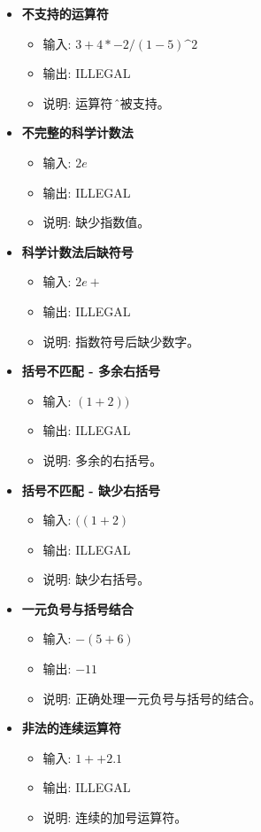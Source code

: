 \documentclass{article}
\begin{document}
\begin{itemize}
    \item \textbf{不支持的运算符}
    \begin{itemize}
        \item 输入: \(3 + 4 * -2 / (1 - 5)\^2\)
        \item 输出: ILLEGAL
        \item 说明: 运算符 \^ 不被支持。
    \end{itemize}
    \item \textbf{不完整的科学计数法}
    \begin{itemize}
        \item 输入: \(2e\)
        \item 输出: ILLEGAL
        \item 说明: 缺少指数值。
    \end{itemize}
    \item \textbf{科学计数法后缺符号}
    \begin{itemize}
        \item 输入: \(2e+\)
        \item 输出: ILLEGAL
        \item 说明: 指数符号后缺少数字。
    \end{itemize}
    \item \textbf{括号不匹配 - 多余右括号}
    \begin{itemize}
        \item 输入: \((1 + 2))\)
        \item 输出: ILLEGAL
        \item 说明: 多余的右括号。
    \end{itemize}
    \item \textbf{括号不匹配 - 缺少右括号}
    \begin{itemize}
        \item 输入: \(((1 + 2)\)
        \item 输出: ILLEGAL
        \item 说明: 缺少右括号。
    \end{itemize}
    \item \textbf{一元负号与括号结合}
    \begin{itemize}
        \item 输入: \(-(5+6)\)
        \item 输出: \(-11\)
        \item 说明: 正确处理一元负号与括号的结合。
    \end{itemize}
    \item \textbf{非法的连续运算符}
    \begin{itemize}
        \item 输入: \(1++2.1\)
        \item 输出: ILLEGAL
        \item 说明: 连续的加号运算符。
    \end{itemize}
\end{itemize}
\end{document}
